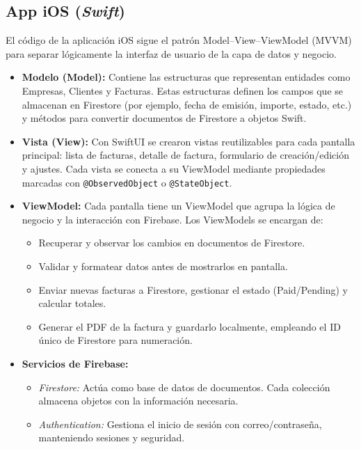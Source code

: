 \subsection*{App iOS (\textit{Swift})}

\begin{large}

El código de la aplicación iOS sigue el patrón Model–View–ViewModel (MVVM) para separar lógicamente la interfaz de usuario de la capa de datos y negocio. 
\begin{itemize}
  \item \textbf{Modelo (Model):} Contiene las estructuras que representan entidades como Empresas, Clientes y Facturas. Estas estructuras definen los campos que se almacenan en Firestore (por ejemplo, fecha de emisión, importe, estado, etc.) y métodos para convertir documentos de Firestore a objetos Swift.
  \item \textbf{Vista (View):} Con SwiftUI se crearon vistas reutilizables para cada pantalla principal: lista de facturas, detalle de factura, formulario de creación/edición y ajustes. Cada vista se conecta a su ViewModel mediante propiedades marcadas con \texttt{@ObservedObject} o \texttt{@StateObject}.
  \item \textbf{ViewModel:} Cada pantalla tiene un ViewModel que agrupa la lógica de negocio y la interacción con Firebase. Los ViewModels se encargan de:
    \begin{itemize}
      \item Recuperar y observar los cambios en documentos de Firestore.
      \item Validar y formatear datos antes de mostrarlos en pantalla.
      \item Enviar nuevas facturas a Firestore, gestionar el estado (Paid/Pending) y calcular totales.
      \item Generar el PDF de la factura y guardarlo localmente, empleando el ID único de Firestore para numeración.
    \end{itemize}
  \item \textbf{Servicios de Firebase:}  
    \begin{itemize}
      \item \textit{Firestore:} Actúa como base de datos de documentos. Cada colección almacena objetos con la información necesaria.
      \item \textit{Authentication:} Gestiona el inicio de sesión con correo/contraseña, manteniendo sesiones y seguridad.
    \end{itemize}
\end{itemize}

\end{large}


